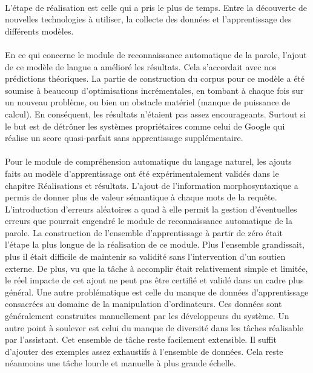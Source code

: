 \paragraph{}
L'étape de réalisation est celle qui a pris le plus de temps. Entre la découverte de nouvelles technologies à utiliser, la collecte des données et l'apprentissage des différents modèles.
\paragraph{}
En ce qui concerne le module de reconnaissance automatique de la parole, l'ajout de ce modèle de langue a amélioré les résultats. Cela s'accordait avec nos prédictions théoriques. La partie de construction du corpus pour ce modèle a été soumise à beaucoup d'optimisations incrémentales, en tombant à chaque fois sur un nouveau problème, ou bien un obstacle matériel (manque de puissance de calcul). En conséquent, les résultats n'étaient pas assez encourageants. Surtout si le but est de détrôner les systèmes propriétaires comme celui de Google qui réalise un score quasi-parfait sans apprentissage supplémentaire.

\paragraph{}


Pour le module de compréhension automatique du langage naturel, les ajouts faits au modèle d'apprentissage ont été expérimentalement validés dans le chapitre Réalisations et résultats. L'ajout de l'information morphosyntaxique a permis de donner plus de valeur sémantique à chaque mots de la requête. L'introduction d'erreurs aléatoires a quad à elle permit la gestion d'éventuelles erreurs que pourrait engendré le module de reconnaissance automatique de la parole. La construction de l'ensemble d'apprentissage à partir de zéro était l'étape la plus longue de la réalisation de ce module. Plus l'ensemble grandissait, plus il était difficile de maintenir sa validité sans l'intervention d'un soutien externe. De plus, vu que la tâche à accomplir était relativement simple et limitée, le réel impacte de cet ajout ne peut pas être certifié et validé dans un cadre plus général. Une autre problématique est celle du manque de données d'apprentissage consacrées au domaine de la manipulation d'ordinateurs. Ces données sont généralement construites manuellement par les développeurs du système. Un autre point à soulever est celui du manque de diversité dans les tâches réalisable par l'assistant. Cet ensemble de tâche reste facilement extensible. Il suffit d'ajouter des exemples assez exhaustifs à l'ensemble de données. Cela reste néanmoins une tâche lourde et manuelle à plus grande échelle.

